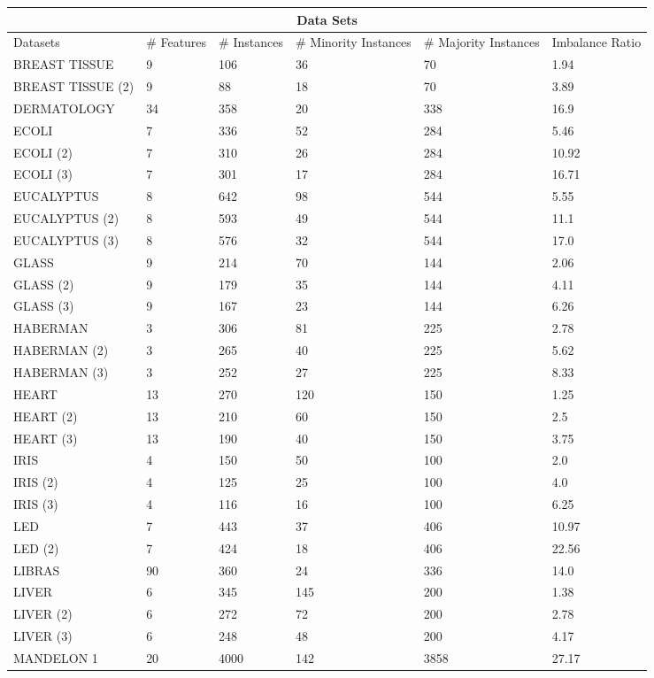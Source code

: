 \documentclass[parskip=full]{scrartcl}
\begin{document}
\begin{table} [H]
   \scriptsize
   \centering

\begin{tabular}{ |p{4cm}||p{2.2cm}|p{2.2cm}|p{2.2cm}|p{2.2cm}|p{2.2cm}|  }  
 \hline
 \multicolumn{6}{|c|}{Data Sets} \\
 \hline
 Datasets & \# Features & \# Instances & \# Minority Instances & \# Majority Instances & Imbalance Ratio \\
 \hline
 
 
BREAST TISSUE&	9&	106&	36&	70&	1.94\\
BREAST TISSUE (2)&	9&	88&	18&	70&	3.89\\
DERMATOLOGY&	34&	358&	20&	338&	16.9\\
ECOLI&	7&	336&	52&	284&	5.46\\
ECOLI (2)&	7&	310&	26&	284&	10.92\\
ECOLI (3)&	7&	301&	17&	284&	16.71\\
EUCALYPTUS&	8&	642&	98&	544&	5.55\\
EUCALYPTUS (2)&	8&	593&	49&	544&	11.1\\
EUCALYPTUS (3)&	8&	576&	32&	544&	17.0\\
GLASS&	9&	214&	70&	144&	2.06\\
GLASS (2)&	9&	179&	35&	144&	4.11\\
GLASS (3)&	9&	167&	23&	144&	6.26\\
HABERMAN&	3&	306&	81&	225&	2.78\\
HABERMAN (2)&	3&	265&	40&	225&	5.62\\
HABERMAN (3)&	3&	252&	27&	225&	8.33\\
HEART&	13&	270&	120&	150&	1.25\\
HEART (2)&	13&	210&	60&	150&	2.5\\
HEART (3)&	13&	190&	40&	150&	3.75\\
IRIS&	4&	150&	50&	100&	2.0\\
IRIS (2)&	4&	125&	25&	100&	4.0\\
IRIS (3)&	4&	116&	16&	100&	6.25\\
LED&	7&	443&	37&	406&	10.97\\
LED (2)&	7&	424&	18&	406&	22.56\\
LIBRAS&	90&	360&	24&	336&	14.0\\
LIVER&	6&	345&	145&	200&	1.38\\
LIVER (2)&	6&	272&	72&	200&	2.78\\
LIVER (3)&	6&	248&	48&	200&	4.17\\
MANDELON 1&	20&	4000&	142&	3858&	27.17\\

\end{tabular}
\end{table}
\end{document}
